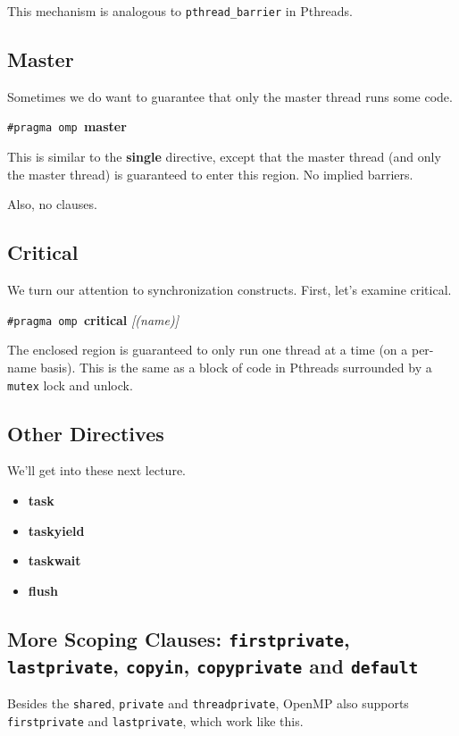      This mechanism is analogous to {\tt pthread\_barrier} in Pthreads.

  \subsection*{Master} Sometimes we do want to guarantee that only the master
thread runs some code.
  \begin{center}
    {\tt \#pragma omp }{\bf master}
  \end{center}

    This is similar to the {\bf single} directive, except that the master thread (and only the master thread) is guaranteed to enter this region.
    No implied barriers. 

Also, no clauses.

  \subsection*{Critical} We turn our attention to synchronization constructs.
First, let's examine critical.
  \begin{center}
    {\tt \#pragma omp }{\bf critical} {\it [(name)]}
  \end{center}

    The enclosed region is guaranteed to only run one thread at a time
      (on a per-name basis).
    This is the same as a block of code in Pthreads surrounded by a {\tt mutex} lock
      and unlock.

\subsection*{Other Directives}
  We'll get into these next lecture.
  \begin{itemize}
    \item {\bf task}
    \item {\bf taskyield}
    \item {\bf taskwait}
    \item {\bf flush}
  \end{itemize}

\subsection*{More Scoping Clauses: {\tt firstprivate}, {\tt lastprivate}, {\tt copyin}, {\tt copyprivate} and {\tt default}}
Besides the {\tt shared}, {\tt private} and {\tt threadprivate}, OpenMP also 
supports {\tt firstprivate} and {\tt lastprivate}, which work like this.

